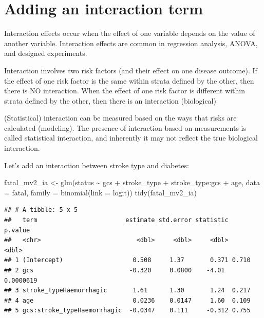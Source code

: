 \documentclass[
  10pt,
]{krantz}
\newenvironment{Shaded}{\begin{snugshade}}{\end{snugshade}}
\newcommand{\AttributeTok}[1]{\textcolor[rgb]{0.77,0.63,0.00}{#1}}
\newcommand{\FunctionTok}[1]{\textcolor[rgb]{0.00,0.00,0.00}{#1}}
\newcommand{\NormalTok}[1]{#1}
\newcommand{\OtherTok}[1]{\textcolor[rgb]{0.56,0.35,0.01}{#1}}
\newcommand{\SpecialCharTok}[1]{\textcolor[rgb]{0.00,0.00,0.00}{#1}}
\newcommand{\StringTok}[1]{\textcolor[rgb]{0.31,0.60,0.02}{#1}}
\begin{document}
\hypertarget{adding-an-interaction-term}{%
\section{\texorpdfstring{Adding an interaction term}{Adding an interaction term}}\label{adding-an-interaction-term}}

Interaction effects occur when the effect of one variable depends on the value of another variable. Interaction effects are common in regression analysis, ANOVA, and designed experiments.

Interaction involves two risk factors (and their effect on one disease outcome). If the effect of one risk factor is the same within strata defined by the other, then there is NO interaction. When the effect of one risk factor is different within strata defined by the other, then there is an interaction (biological)

(Statistical) interaction can be measured based on the ways that risks are calculated (modeling). The presence of interaction based on measurements is called statistical interaction, and inherently it may not reflect the true biological interaction.

Let's add an interaction between stroke type and diabetes:

\begin{Shaded}
\begin{Highlighting}[]
\NormalTok{fatal\_mv2\_ia }\OtherTok{\textless{}{-}} 
  \FunctionTok{glm}\NormalTok{(status }\SpecialCharTok{\textasciitilde{}}\NormalTok{ gcs }\SpecialCharTok{+}\NormalTok{ stroke\_type }\SpecialCharTok{+}\NormalTok{ stroke\_type}\SpecialCharTok{:}\NormalTok{gcs }\SpecialCharTok{+}\NormalTok{ age, }
      \AttributeTok{data =}\NormalTok{ fatal, }
      \AttributeTok{family =} \FunctionTok{binomial}\NormalTok{(}\AttributeTok{link =} \StringTok{\textquotesingle{}logit\textquotesingle{}}\NormalTok{))}
\FunctionTok{tidy}\NormalTok{(fatal\_mv2\_ia)}
\end{Highlighting}
\end{Shaded}

\begin{verbatim}
## # A tibble: 5 x 5
##   term                        estimate std.error statistic   p.value
##   <chr>                          <dbl>     <dbl>     <dbl>     <dbl>
## 1 (Intercept)                   0.508     1.37       0.371 0.710    
## 2 gcs                          -0.320     0.0800    -4.01  0.0000619
## 3 stroke_typeHaemorrhagic       1.61      1.30       1.24  0.217    
## 4 age                           0.0236    0.0147     1.60  0.109    
## 5 gcs:stroke_typeHaemorrhagic  -0.0347    0.111     -0.312 0.755
\end{verbatim}
\end{document}
